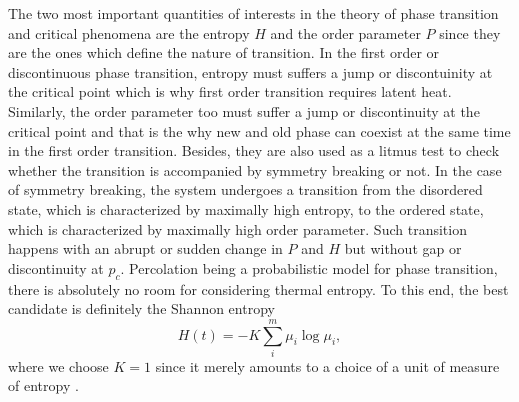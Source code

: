 \documentclass[twocolumn,showpacs,preprintnumbers,amsmath,amssymb]{article}
\begin{document}
The two most important quantities of interests in the theory of phase transition and critical phenomena 
are the entropy $H$ and the order parameter $P$ since they are the ones
which define the nature of transition. In the first order or discontinuous phase transition,
 entropy must suffers a jump or discontuinity at the critical point which is 
why first order transition
requires latent heat. Similarly, the order parameter too must suffer a jump or discontinuity at
the critical point and that is the why new and old 
phase can coexist at the same time in the first order transition. Besides, they are also used as a litmus test to check
whether the transition is accompanied by symmetry breaking or not. In the case of symmetry breaking,
the system undergoes a transition from the disordered state, which is characterized by maximally high
entropy, to the ordered state, which is characterized by maximally high order parameter. 
Such transition happens with an abrupt or sudden
change in $P$ and $H$ but without gap or discontinuity at $p_c$. 
Percolation being a probabilistic model for phase transition, there is
absolutely no room for considering thermal entropy. To this end, the 
best candidate is definitely the Shannon entropy  
\begin{equation}
\label{eq:shannon_entropy}
H(t)=-K\sum_i^m \mu_i\log \mu_i,
\end{equation} 
where we choose $K=1$ since it merely amounts to a choice of a unit of measure of entropy 
\cite{ref.shannon}. 


\end{document}
